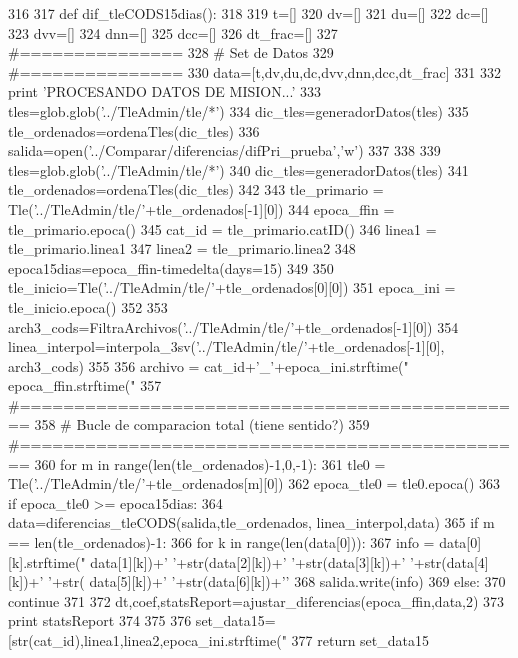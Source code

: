 \begin{DoxyCode}
316 
317 def dif_tleCODS15dias():
318     
319     t=[]
320     dv=[]
321     du=[]
322     dc=[]
323     dvv=[]
324     dnn=[]
325     dcc=[]
326     dt_frac=[]
327     #===============
328     # Set de Datos
329     #===============
330     data=[t,dv,du,dc,dvv,dnn,dcc,dt_frac]   
331     
332     print 'PROCESANDO DATOS DE MISION...'
333     tles=glob.glob('../TleAdmin/tle/*')
334     dic_tles=generadorDatos(tles)
335     tle_ordenados=ordenaTles(dic_tles)
336     salida=open('../Comparar/diferencias/difPri_prueba','w')
337      
338     
339     tles=glob.glob('../TleAdmin/tle/*')
340     dic_tles=generadorDatos(tles)
341     tle_ordenados=ordenaTles(dic_tles)
342     
343     tle_primario = Tle('../TleAdmin/tle/'+tle_ordenados[-1][0])
344     epoca_ffin  = tle_primario.epoca()
345     cat_id = tle_primario.catID()
346     linea1 = tle_primario.linea1
347     linea2 = tle_primario.linea2
348     epoca15dias=epoca_ffin-timedelta(days=15)
349     
350     tle_inicio=Tle('../TleAdmin/tle/'+tle_ordenados[0][0])
351     epoca_ini  = tle_inicio.epoca()
352     
353     arch3_cods=FiltraArchivos('../TleAdmin/tle/'+tle_ordenados[-1][0])
354     linea_interpol=interpola_3sv('../TleAdmin/tle/'+tle_ordenados[-1][0], 
      arch3_cods)
355     
356     archivo = cat_id+'_'+epoca_ini.strftime("%
      epoca_ffin.strftime("%
357     #===============================================
358     # Bucle de comparacion total  (tiene sentido?)
359     #===============================================
360     for m in range(len(tle_ordenados)-1,0,-1):
361         tle0 = Tle('../TleAdmin/tle/'+tle_ordenados[m][0])
362         epoca_tle0 = tle0.epoca()
363         if epoca_tle0 >= epoca15dias:          
364             data=diferencias_tleCODS(salida,tle_ordenados, linea_interpol,data)
365             if m == len(tle_ordenados)-1:
366                 for k in range(len(data[0])):
367                     info = data[0][k].strftime("%
      data[1][k])+' '+str(data[2][k])+' '+str(data[3][k])+' '+str(data[4][k])+' '+str(
      data[5][k])+' '+str(data[6][k])+'\n'
368                     salida.write(info)
369         else:
370             continue
371     
372     dt,coef,statsReport=ajustar_diferencias(epoca_ffin,data,2)    
373     print statsReport
374     
375     
376     set_data15=[str(cat_id),linea1,linea2,epoca_ini.strftime("%
377     return set_data15

\end{DoxyCode}
